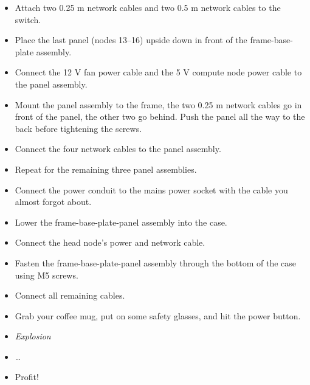 \begin{itemize}
	\item Attach two 0.25 m network cables and two 0.5 m network cables to the switch.
	\item Place the last panel (nodes 13--16) upside down in front of the frame-base-plate assembly.
	\item Connect the 12 V fan power cable and the 5 V compute node power cable to the panel assembly.
	\item Mount the panel assembly to the frame, the two 0.25 m network cables go in front of the panel, the other two go behind.
		Push the panel all the way to the back before tightening the screws.
	\item Connect the four network cables to the panel assembly.
	\item Repeat for the remaining three panel assemblies.
	\item Connect the power conduit to the mains power socket with the cable you almost forgot about.
	\item Lower the frame-base-plate-panel assembly into the case.
	\item Connect the head node's power and network cable.
	\item Fasten the frame-base-plate-panel assembly through the bottom of the case using M5 screws.
	\item Connect all remaining cables.
	\item Grab your coffee mug, put on some safety glasses, and hit the power button.
	\item \textit{Explosion}
	\item \dots
	\item Profit!
\end{itemize}

